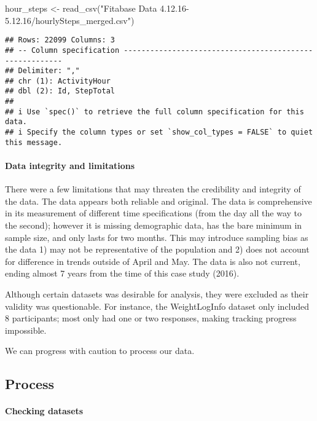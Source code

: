 \documentclass[
]{article}
\newenvironment{Shaded}{\begin{snugshade}}{\end{snugshade}}
\newcommand{\FunctionTok}[1]{\textcolor[rgb]{0.00,0.00,0.00}{#1}}
\newcommand{\NormalTok}[1]{#1}
\newcommand{\OtherTok}[1]{\textcolor[rgb]{0.56,0.35,0.01}{#1}}
\newcommand{\StringTok}[1]{\textcolor[rgb]{0.31,0.60,0.02}{#1}}
\begin{document}
\begin{Shaded}
\begin{Highlighting}[]
\NormalTok{hour\_steps }\OtherTok{\textless{}{-}} \FunctionTok{read\_csv}\NormalTok{(}\StringTok{"Fitabase Data 4.12.16{-}5.12.16/hourlySteps\_merged.csv"}\NormalTok{)}
\end{Highlighting}
\end{Shaded}

\begin{verbatim}
## Rows: 22099 Columns: 3
## -- Column specification --------------------------------------------------------
## Delimiter: ","
## chr (1): ActivityHour
## dbl (2): Id, StepTotal
## 
## i Use `spec()` to retrieve the full column specification for this data.
## i Specify the column types or set `show_col_types = FALSE` to quiet this message.
\end{verbatim}

\hypertarget{data-integrity-and-limitations}{%
\paragraph{Data integrity and
limitations}\label{data-integrity-and-limitations}}

There were a few limitations that may threaten the credibility and
integrity of the data. The data appears both reliable and original. The
data is comprehensive in its measurement of different time
specifications (from the day all the way to the second); however it is
missing demographic data, has the bare minimum in sample size, and only
lasts for two months. This may introduce sampling bias as the data 1)
may not be representative of the population and 2) does not account for
difference in trends outside of April and May. The data is also not
current, ending almost 7 years from the time of this case study (2016).

Although certain datasets was desirable for analysis, they were excluded
as their validity was questionable. For instance, the WeightLogInfo
dataset only included 8 participants; most only had one or two
responses, making tracking progress impossible.

We can progress with caution to process our data.

\hypertarget{process}{%
\subsection{Process}\label{process}}

\hypertarget{checking-datasets}{%
\paragraph{Checking datasets}\label{checking-datasets}}
\end{document}
